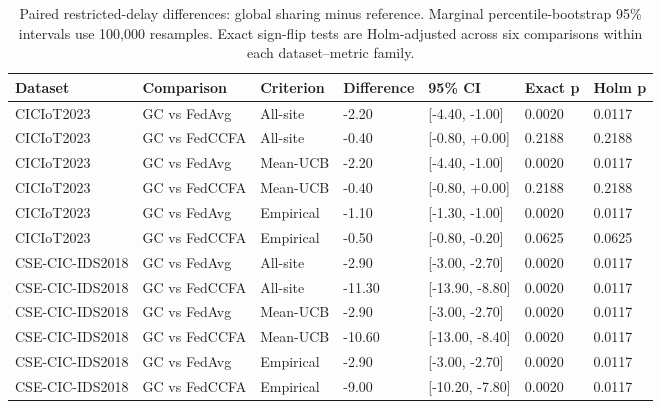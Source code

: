 \begin{table}[t]
\centering
\small
\setlength{\tabcolsep}{3pt}
\caption{Paired restricted-delay differences: global sharing minus reference. Marginal percentile-bootstrap 95\% intervals use 100,000 resamples. Exact sign-flip tests are Holm-adjusted across six comparisons within each dataset--metric family.}
\label{tab:paired_calibrated_dissemination}
\begin{tabular}{lllllll}
\hline
Dataset & Comparison & Criterion & Difference & 95\% CI & Exact p & Holm p \\
\hline
CICIoT2023 & GC vs FedAvg & All-site & -2.20 & [-4.40, -1.00] & 0.0020 & 0.0117 \\
CICIoT2023 & GC vs FedCCFA & All-site & -0.40 & [-0.80, +0.00] & 0.2188 & 0.2188 \\
CICIoT2023 & GC vs FedAvg & Mean-UCB & -2.20 & [-4.40, -1.00] & 0.0020 & 0.0117 \\
CICIoT2023 & GC vs FedCCFA & Mean-UCB & -0.40 & [-0.80, +0.00] & 0.2188 & 0.2188 \\
CICIoT2023 & GC vs FedAvg & Empirical & -1.10 & [-1.30, -1.00] & 0.0020 & 0.0117 \\
CICIoT2023 & GC vs FedCCFA & Empirical & -0.50 & [-0.80, -0.20] & 0.0625 & 0.0625 \\
CSE-CIC-IDS2018 & GC vs FedAvg & All-site & -2.90 & [-3.00, -2.70] & 0.0020 & 0.0117 \\
CSE-CIC-IDS2018 & GC vs FedCCFA & All-site & -11.30 & [-13.90, -8.80] & 0.0020 & 0.0117 \\
CSE-CIC-IDS2018 & GC vs FedAvg & Mean-UCB & -2.90 & [-3.00, -2.70] & 0.0020 & 0.0117 \\
CSE-CIC-IDS2018 & GC vs FedCCFA & Mean-UCB & -10.60 & [-13.00, -8.40] & 0.0020 & 0.0117 \\
CSE-CIC-IDS2018 & GC vs FedAvg & Empirical & -2.90 & [-3.00, -2.70] & 0.0020 & 0.0117 \\
CSE-CIC-IDS2018 & GC vs FedCCFA & Empirical & -9.00 & [-10.20, -7.80] & 0.0020 & 0.0117 \\
\hline
\end{tabular}
\end{table}
